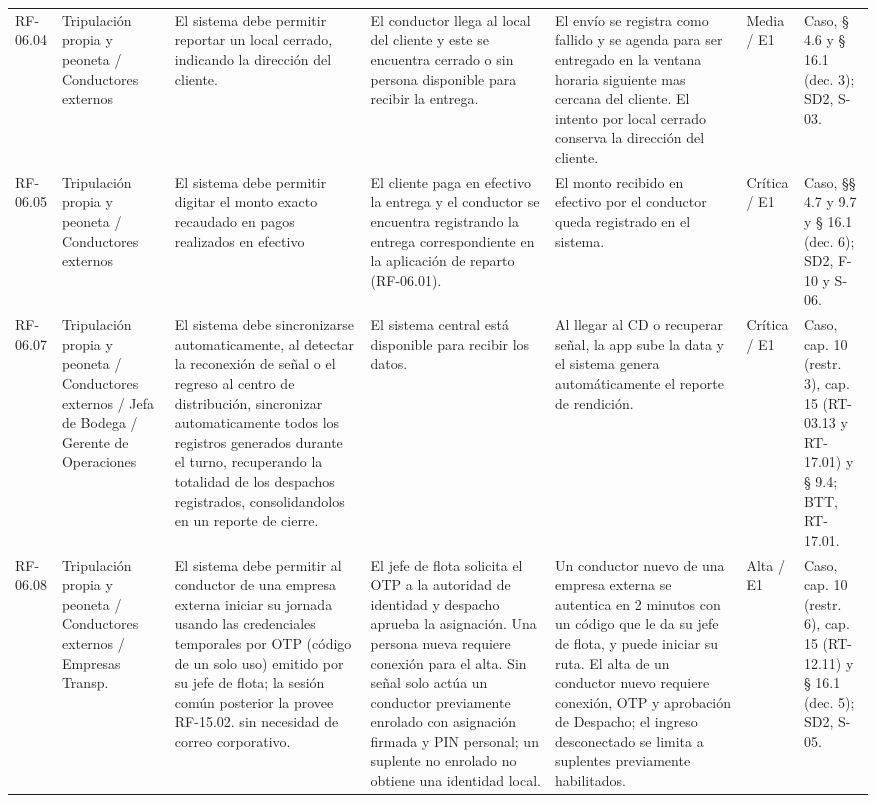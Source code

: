 {\begin{longtable}{@{}F{0.062} F{0.080} F{0.195} F{0.160} F{0.240} F{0.093} F{0.170}@{}}
  RF-06.04 & Tripulación propia y peoneta / Conductores externos & El sistema debe permitir reportar un local cerrado, indicando la dirección del cliente. & El conductor llega al local del cliente y este se encuentra cerrado o sin persona disponible para recibir la entrega. & El envío se registra como fallido y se agenda para ser entregado en la ventana horaria siguiente mas cercana del cliente. El intento por local cerrado conserva la dirección del cliente. & Media / E1 & Caso, § 4.6 y § 16.1 (dec. 3); SD2, S-03. \\
  RF-06.05 & Tripulación propia y peoneta / Conductores externos & El sistema debe permitir digitar el monto exacto recaudado en pagos realizados en efectivo & El cliente paga en efectivo la entrega y el conductor se encuentra registrando la entrega correspondiente en la aplicación de reparto (RF-06.01). & El monto recibido en efectivo por el conductor queda registrado en el sistema. & Crítica / E1 & Caso, §§ 4.7 y 9.7 y § 16.1 (dec. 6); SD2, F-10 y S-06. \\
  RF-06.07 & Tripulación propia y peoneta / Conductores externos / Jefa de Bodega / Gerente de Operaciones & El sistema debe sincronizarse automaticamente, al detectar la reconexión de señal o el regreso al centro de distribución, sincronizar automaticamente todos los registros generados durante el turno, recuperando la totalidad de los despachos registrados, consolidandolos en un reporte de cierre. & El sistema central está disponible para recibir los datos. & Al llegar al CD o recuperar señal, la app sube la data y el sistema genera automáticamente el reporte de rendición. & Crítica / E1 & Caso, cap. 10 (restr. 3), cap. 15 (RT-03.13 y RT-17.01) y § 9.4; BTT, RT-17.01. \\
  RF-06.08 & Tripulación propia y peoneta / Conductores externos / Empresas Transp. & El sistema debe permitir al conductor de una empresa externa iniciar su jornada usando las credenciales temporales por OTP (código de un solo uso) emitido por su jefe de flota; la sesión común posterior la provee RF-15.02. sin necesidad de correo corporativo. & El jefe de flota solicita el OTP a la autoridad de identidad y despacho aprueba la asignación. Una persona nueva requiere conexión para el alta. Sin señal solo actúa un conductor previamente enrolado con asignación firmada y PIN personal; un suplente no enrolado no obtiene una identidad local. & Un conductor nuevo de una empresa externa se autentica en 2 minutos con un código que le da su jefe de flota, y puede iniciar su ruta. El alta de un conductor nuevo requiere conexión, OTP y aprobación de Despacho; el ingreso desconectado se limita a suplentes previamente habilitados. & Alta / E1 & Caso, cap. 10 (restr. 6), cap. 15 (RT-12.11) y § 16.1 (dec. 5); SD2, S-05. \\

\end{longtable}}
